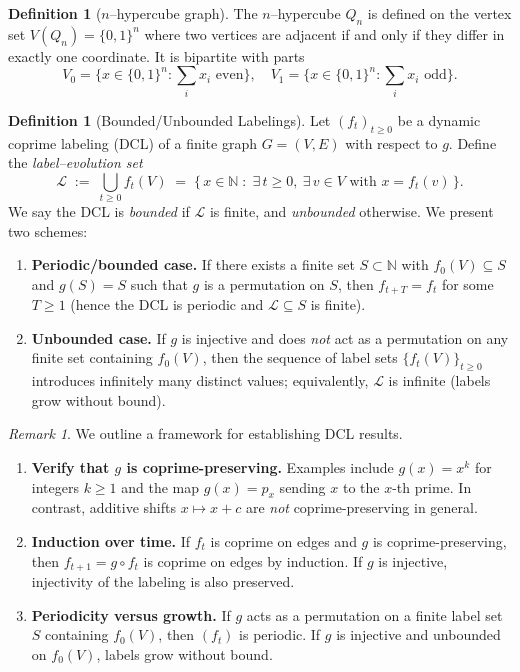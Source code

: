 \documentclass[12pt]{amsart}
\theoremstyle{plain}
\theoremstyle{definition}
\newtheorem{defn}[thm]{Definition}
\theoremstyle{remark}
\newtheorem{remark}[thm]{Remark}
\numberwithin{equation}{section}
\begin{document}
\begin{defn}[$n$--hypercube graph]
The $n$--hypercube $Q_n$ is defined on the vertex set $V(Q_n)=\{0,1\}^n$ where two vertices are adjacent if and only if they differ in exactly one coordinate. It is bipartite with parts
\[
V_0=\{x\in\{0,1\}^n: \sum_i x_i \text{ even}\}, \quad
V_1=\{x\in\{0,1\}^n: \sum_i x_i \text{ odd}\}.
\]
\end{defn}

\begin{defn}[Bounded/Unbounded Labelings]\label{def:bounded-dichotomy}
Let $(f_t)_{t\ge 0}$ be a dynamic coprime labeling (DCL) of a finite graph $G=(V,E)$ with respect to $g$. Define the \emph{label--evolution set}
\[
\mathcal{L} \;:=\; \bigcup_{t\ge 0} f_t(V)
\;=\; \{\, x\in\mathbb{N} \;:\; \exists\, t\ge 0,\ \exists\, v\in V \text{ with } x=f_t(v)\,\}.
\]
We say the DCL is \emph{bounded} if $\mathcal{L}$ is finite, and \emph{unbounded} otherwise. We present two schemes:
\begin{enumerate}
  \item \textbf{Periodic/bounded case.} If there exists a finite set $S\subset\mathbb{N}$ with $f_0(V)\subseteq S$ and $g(S)=S$ such that $g$ is a permutation on $S$, then $f_{t+T}=f_t$ for some $T\ge 1$ (hence the DCL is periodic and $\mathcal{L}\subseteq S$ is finite).
  \item \textbf{Unbounded case.} If $g$ is injective and does \emph{not} act as a permutation on any finite set containing $f_0(V)$, then the sequence of label sets $\{f_t(V)\}_{t\ge 0}$ introduces infinitely many distinct values; equivalently, $\mathcal{L}$ is infinite (labels grow without bound).
\end{enumerate}
\end{defn}

\begin{remark}
We outline a framework for establishing DCL results.
\begin{enumerate}
  \item \textbf{Verify that $g$ is coprime-preserving.} Examples include $g(x)=x^k$ for integers $k\ge1$ and the map $g(x)=p_x$ sending $x$ to the $x$-th prime. In contrast, additive shifts $x\mapsto x+c$ are \emph{not} coprime-preserving in general.
  \item \textbf{Induction over time.} If $f_t$ is coprime on edges and $g$ is coprime-preserving, then $f_{t+1}=g\circ f_t$ is coprime on edges by induction. If $g$ is injective, injectivity of the labeling is also preserved.
  \item \textbf{Periodicity versus growth.} If $g$ acts as a permutation on a finite label set $S$ containing $f_0(V)$, then $(f_t)$ is periodic. If $g$ is injective and unbounded on $f_0(V)$, labels grow without bound.
\end{enumerate}
\end{remark}
\end{document}
